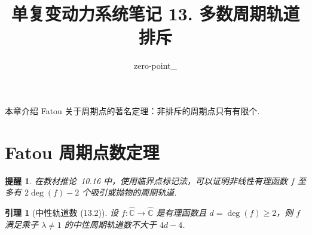 \documentclass[11pt, a4paper, oneside]{ctexart}
\title{单复变动力系统笔记 13. 多数周期轨道排斥}
\author{zero-point\_}
\newtheorem{lemma}[theorem]{引理}
\newtheorem{remind}[theorem]{提醒}
\newcommand{\C}{\mathbb{C}}
\begin{document}
	\maketitle

    本章介绍 Fatou 关于周期点的著名定理：非排斥的周期点只有有限个.

    \section{Fatou 周期点数定理}
    \begin{remind}\label{提醒13.1}
        在教材推论~10.16 中，使用临界点标记法，可以证明非线性有理函数 $f$ 至多有 $2\deg(f)-2$ 个吸引或抛物的周期轨道.
    \end{remind}

    \begin{lemma}[中性轨道数 (13.2)]\label{引理13.2}
        设 $f:\hat{\C}\to\hat{\C}$ 是有理函数且 $d=\deg(f)\geq 2$，则 $f$ 满足乘子 $\lambda\neq 1$ 的中性周期轨道数不大于 $4d-4$.
    \end{lemma}
\end{document}
